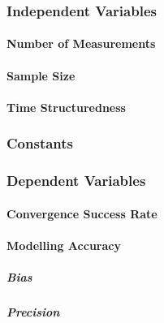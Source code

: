 \documentclass[
12pt, %
twoside,
english]{guelphthesis}
\begin{document}
\hypertarget{independent-variables-2}{%
\subsubsection{Independent Variables}\label{independent-variables-2}}

\hypertarget{number-of-measurements-2}{%
\paragraph{Number of Measurements}\label{number-of-measurements-2}}

\hypertarget{sample-size-1}{%
\paragraph{Sample Size}\label{sample-size-1}}

\hypertarget{time-structuredness-1}{%
\paragraph{Time Structuredness}\label{time-structuredness-1}}

\hypertarget{constants-1}{%
\subsubsection{Constants}\label{constants-1}}

\hypertarget{dependent-variables-2}{%
\subsubsection{Dependent Variables}\label{dependent-variables-2}}

\hypertarget{convergence-success-rate-1}{%
\paragraph{Convergence Success Rate}\label{convergence-success-rate-1}}

\hypertarget{modelling-accuracy-2}{%
\paragraph{Modelling Accuracy}\label{modelling-accuracy-2}}

\hypertarget{bias-comp}{%
\subparagraph{Bias}\label{bias-comp}}

\hypertarget{pres-precision}{%
\subparagraph{Precision}\label{pres-precision}}
\end{document}
